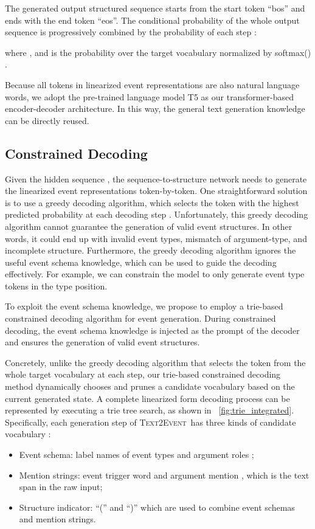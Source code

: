\documentclass[11pt,a4paper]{article}
\newcommand\modelname{\textsc{Text2Event}}
\begin{document}
The generated output structured sequence starts from the start token ``bos'' and ends with the end token ``eos''. The conditional probability of the whole output sequence  is progressively combined by the probability of each step :

where , and  is the probability over the target vocabulary  normalized by softmax() .

Because all tokens in linearized event representations are also natural language words, we adopt the pre-trained language model T5 \cite{Raffel:JMLR2020:T5} as our transformer-based encoder-decoder architecture.
In this way, the general text generation knowledge can be directly reused.

\subsection{Constrained Decoding} \label{sec:constrained_decoding}

Given the hidden sequence , the sequence-to-structure network needs to generate the linearized event representations token-by-token.
One straightforward solution is to use a greedy decoding algorithm, which selects the token with the highest predicted probability  at each decoding step .
Unfortunately, this greedy decoding algorithm cannot guarantee the generation of valid event structures.
In other words, it could end up with invalid event types, mismatch of argument-type, and incomplete structure.
Furthermore, the greedy decoding algorithm ignores the useful event schema knowledge, which can be used to guide the decoding effectively.
For example, we can constrain the model to only generate event type tokens in the type position.

To exploit the event schema knowledge, we propose to employ a trie-based constrained decoding algorithm \citep{chen-etal-2020-parallel,decao2020autoregressive} for event generation.
During constrained decoding, the event schema knowledge is injected as the prompt of the decoder and ensures the generation of valid event structures.

Concretely, unlike the greedy decoding algorithm that selects the token from the whole target vocabulary  at each step, our trie-based constrained decoding method dynamically chooses and prunes a candidate vocabulary  based on the current generated state.
A complete linearized form decoding process can be represented by executing a trie tree search, as shown in \figurename~\ref{fig:trie_integrated}.
Specifically, each generation step of \modelname\, has three kinds of candidate vocabulary :
\begin{itemize}
    \item Event schema: label names of event types  and argument roles ;
    \item Mention strings: event trigger word and argument mention , which is the text span in the raw input;
    \item Structure indicator: ``('' and ``)'' which are used to combine event schemas and mention strings.
\end{itemize}
\end{document}

